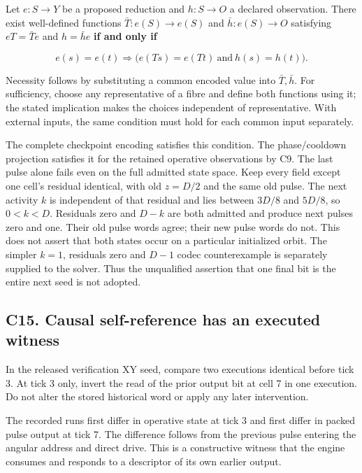 \documentclass[11pt,a4paper]{article}
\begin{document}
Let \(e:S\to Y\) be a proposed reduction and \(h:S\to O\) a declared
observation. There exist well-defined functions \(\bar T:e(S)\to e(S)\)
and \(\bar h:e(S)\to O\) satisfying \(eT=\bar T e\) and \(h=\bar h e\)
\textbf{if and only if}

\[
e(s)=e(t)\Longrightarrow
\big(e(Ts)=e(Tt)\ \text{and}\ h(s)=h(t)\big).
\]

Necessity follows by substituting a common encoded value into
\(\bar T,\bar h\). For sufficiency, choose any representative of a fibre
and define both functions using it; the stated implication makes the
choices independent of representative. With external inputs, the same
condition must hold for each common input separately.

The complete checkpoint encoding satisfies this condition. The
phase/cooldown projection satisfies it for the retained operative
observations by C9. The last pulse alone fails even on the full admitted
state space. Keep every field except one cell's residual identical, with
old \(z=D/2\) and the same old pulse. The next activity \(k\) is
independent of that residual and lies between \(3D/8\) and \(5D/8\), so
\(0<k<D\). Residuals zero and \(D-k\) are both admitted and produce next
pulses zero and one. Their old pulse words agree; their new pulse words
do not. This does not assert that both states occur on a particular
initialized orbit. The simpler \(k=1\), residuals zero and \(D-1\) codec
counterexample is separately supplied to the solver. Thus the
unqualified assertion that one final bit is the entire next seed is not
adopted.

\subsection{C15. Causal self-reference has an executed
witness}\label{c15.-causal-self-reference-has-an-executed-witness}

In the released verification XY seed, compare two executions identical
before tick 3. At tick 3 only, invert the read of the prior output bit
at cell 7 in one execution. Do not alter the stored historical word or
apply any later intervention.

The recorded runs first differ in operative state at tick 3 and first
differ in packed pulse output at tick 7. The difference follows from the
previous pulse entering the angular address and direct drive. This is a
constructive witness that the engine consumes and responds to a
descriptor of its own earlier output.
\end{document}
